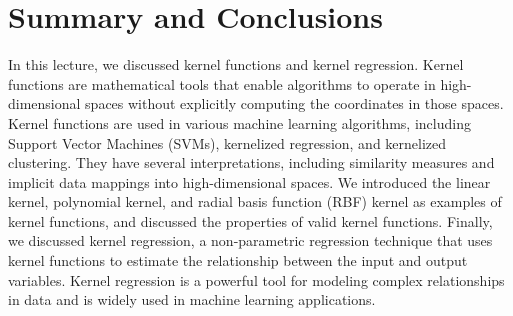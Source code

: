 \documentclass{article}[11pt]
\begin{document}
\section{Summary and Conclusions}
In this lecture, we discussed kernel functions and kernel regression.
Kernel functions are mathematical tools that enable algorithms to operate in high-dimensional spaces without explicitly computing the coordinates in those spaces.
Kernel functions are used in various machine learning algorithms, including Support Vector Machines (SVMs), kernelized regression, and kernelized clustering.
They have several interpretations, including similarity measures and implicit data mappings into high-dimensional spaces.
We introduced the linear kernel, polynomial kernel, and radial basis function (RBF) kernel as examples of kernel functions, 
and discussed the properties of valid kernel functions.
Finally, we discussed kernel regression, a non-parametric regression technique that uses kernel functions to estimate the relationship between the input and output variables.
Kernel regression is a powerful tool for modeling complex relationships in data and is widely used in machine learning applications.

% 
\end{document}
